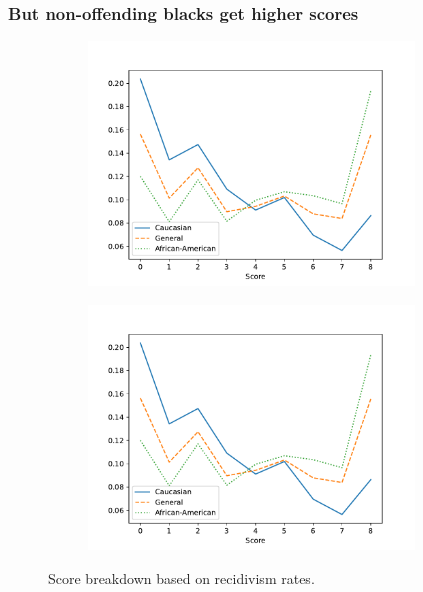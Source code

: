 \begin{frame}
  \frametitle{But non-offending blacks get higher scores}
  \begin{figure}[H]
    \centering
    \begin{subfigure}{0.45\textwidth}
      \includegraphics[width=0.95\textwidth]{../figures/balance-recidivism-compas}
    \end{subfigure}
    \begin{subfigure}{0.45\textwidth}
      \includegraphics[width=0.95\textwidth]{../figures/balance-recidivism-compas}
    \end{subfigure}
    \caption{Score breakdown based on recidivism rates.}
    \label{fig:imrs-risk}
  \end{figure}
\end{frame}

